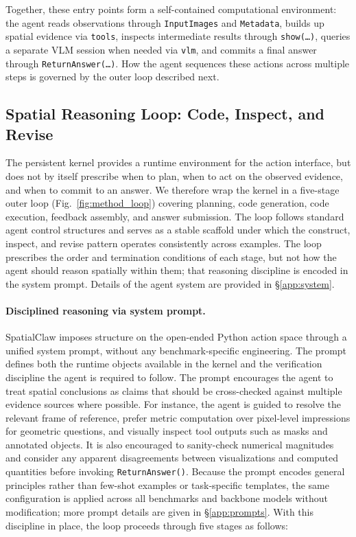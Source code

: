 \documentclass{llmxive}
\providecommand{\ours}{SpatialClaw}
\providecommand{\paragrapht}{\paragraph}
\begin{document}
Together, these entry points form a self-contained computational environment: the agent reads observations through \texttt{InputImages} and \texttt{Metadata}, builds up spatial evidence via \texttt{tools}, inspects intermediate results through \texttt{show(\ldots)}, queries a separate VLM session when needed via \texttt{vlm}, and commits a final answer through \texttt{ReturnAnswer(\ldots)}.
How the agent sequences these actions across multiple steps is governed by the outer loop described next.

\subsection{Spatial Reasoning Loop: Code, Inspect, and Revise}
\label{sec:loop}

The persistent kernel provides a runtime environment for the action interface, but does not by itself prescribe when to plan, when to act on the observed evidence, and when to commit to an answer.
We therefore wrap the kernel in a five-stage outer loop (Fig.~\ref{fig:method_loop}) covering planning, code generation, code execution, feedback assembly, and answer submission.
The loop follows standard agent control structures and serves as a stable scaffold under which the construct, inspect, and revise pattern operates consistently across examples.
The loop prescribes the order and termination conditions of each stage, but not how the agent should reason spatially within them; that reasoning discipline is encoded in the system prompt. Details of the agent system are provided in \S\ref{app:system}.

\paragrapht{Disciplined reasoning via system prompt.}
\ours{} imposes structure on the open-ended Python action space through a unified system prompt, without any benchmark-specific engineering.
The prompt defines both the runtime objects available in the kernel and the verification discipline the agent is required to follow.
The prompt encourages the agent to treat spatial conclusions as claims that should be cross-checked against multiple evidence sources where possible.
For instance, the agent is guided to resolve the relevant frame of reference, prefer metric computation over pixel-level impressions for geometric questions, and visually inspect tool outputs such as masks and annotated objects.
It is also encouraged to sanity-check numerical magnitudes and consider any apparent disagreements between visualizations and computed quantities before invoking \texttt{ReturnAnswer()}.
Because the prompt encodes general principles rather than few-shot examples or task-specific templates, the same configuration is applied across all benchmarks and backbone models without modification; more prompt details are given in \S\ref{app:prompts}.
With this discipline in place, the loop proceeds through five stages as follows:
\end{document}
